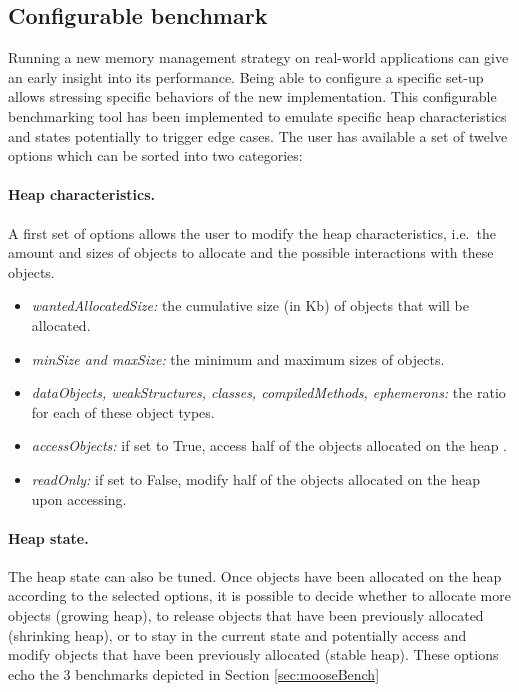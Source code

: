 \documentclass[10pt, sigplan]{acmart}
\begin{document}
\subsection{Configurable benchmark} \label{sec:confBench}

Running a new memory management strategy on real-world applications can give an early insight into its performance. Being able to configure a specific set-up allows stressing specific behaviors of the new implementation.
This configurable benchmarking tool has been implemented to emulate specific heap characteristics and states potentially to trigger edge cases. The user has available a set of twelve options which can be sorted into two categories:

\paragraph{Heap characteristics.} A first set of options allows the user to modify the heap characteristics, i.e.\ the amount and sizes of objects to allocate and the possible interactions with these objects. 

\begin{itemize}
\item \emph{wantedAllocatedSize:} the cumulative size (in Kb) of objects that will be allocated.
\item \emph{minSize and maxSize:} the minimum and maximum sizes of objects.
\item \emph{dataObjects, weakStructures, classes, compiledMethods, ephemerons:} the ratio for each of these object types.
\item \emph{accessObjects:} if set to True, access half of the objects allocated on the heap .
\item \emph{readOnly:} if set to False, modify half of the objects allocated on the heap upon accessing.
\end{itemize}

\paragraph{Heap state.} The heap state can also be tuned. Once objects have been allocated on the heap according to the selected options, it is possible to decide whether to allocate more objects (growing heap), to release objects that have been previously allocated (shrinking heap), or to stay in the current state and potentially access and modify objects that have been previously allocated (stable heap). These options echo the 3 benchmarks depicted in Section \ref{sec:mooseBench}\\
\end{document}
